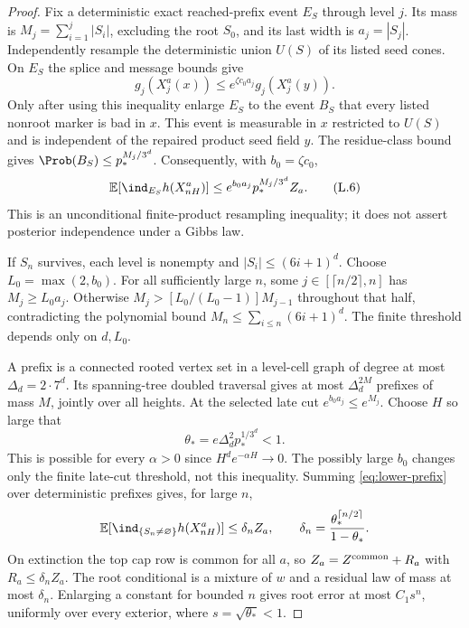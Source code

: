 \begin{proof}
Fix a deterministic exact reached-prefix event $E_S$ through level $j$. Its mass is $M_j=\sum_{i=1}^j|S_i|$, excluding the root $S_0$, and its last width is $a_j=|S_j|$. Independently resample the deterministic union $U(S)$ of its listed seed cones. On $E_S$ the splice and message bounds give
\[
 g_j(X^a_j(x))\le e^{\zeta c_0a_j}g_j(X^a_j(y)).
\]
Only after using this inequality enlarge $E_S$ to the event $B_S$ that every listed nonroot marker is bad in $x$. This event is measurable in $x$ restricted to $U(S)$ and is independent of the repaired product seed field $y$. The residue-class bound gives $\Prob(B_S)\le p_*^{M_j/3^d}$. Consequently, with $b_0=\zeta c_0$,
\[
 \mathbb E[\ind_{E_S}h(X^a_{nH})]
 \le e^{b_0a_j}p_*^{M_j/3^d}Z_a.                 \tag{L.6}\label{eq:lower-prefix}
\]
This is an unconditional finite-product resampling inequality; it does not assert posterior independence under a Gibbs law.

If $S_n$ survives, each level is nonempty and $|S_i|\le(6i+1)^d$. Choose $L_0=\max(2,b_0)$. For all sufficiently large $n$, some $j\in[\lceil n/2\rceil,n]$ has $M_j\ge L_0a_j$. Otherwise $M_j>[L_0/(L_0-1)]M_{j-1}$ throughout that half, contradicting the polynomial bound $M_n\le\sum_{i\le n}(6i+1)^d$. The finite threshold depends only on $d,L_0$.

A prefix is a connected rooted vertex set in a level-cell graph of degree at most $\Delta_d=2\cdot7^d$. Its spanning-tree doubled traversal gives at most $\Delta_d^{2M}$ prefixes of mass $M$, jointly over all heights. At the selected late cut $e^{b_0a_j}\le e^{M_j}$. Choose $H$ so large that
\[
 \theta_*=e\Delta_d^2p_*^{1/3^d}<1.
\]
This is possible for every $\alpha>0$ since $H^de^{-\alpha H}\to0$. The possibly large $b_0$ changes only the finite late-cut threshold, not this inequality. Summing \eqref{eq:lower-prefix} over deterministic prefixes gives, for large $n$,
\[
 \mathbb E[\ind_{\{S_n\ne\varnothing\}}h(X^a_{nH})]
 \le\delta_nZ_a,\qquad
 \delta_n=\frac{\theta_*^{\lceil n/2\rceil}}{1-\theta_*}.
\]
On extinction the top cap row is common for all $a$, so $Z_a=Z^{\rm common}+R_a$ with $R_a\le\delta_nZ_a$. The root conditional is a mixture of $w$ and a residual law of mass at most $\delta_n$. Enlarging a constant for bounded $n$ gives root error at most $C_1s^n$, uniformly over every exterior, where $s=\sqrt{\theta_*}<1$.


\end{proof}
